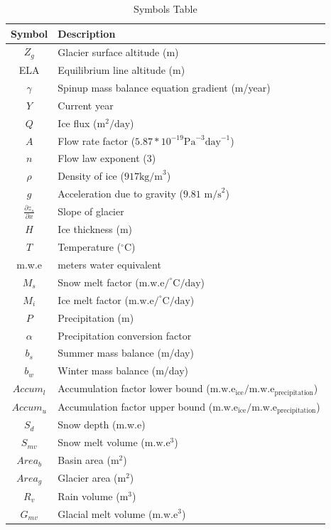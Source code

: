 \documentclass{article}
\begin{document}
\begin{table}[h!]
    \centering
    \begin{tabularx}{\textwidth}{|c|X|}
        \hline
        Symbol & Description \\
        \hline
        $Z_g$ & Glacier surface altitude (m) \\
        ELA & Equilibrium line altitude (m)\\
        $\gamma$ & Spinup mass balance equation gradient (m/year)\\
        $Y$ & Current year \\
        $Q$ & Ice flux ($\text{m}^2/\text{day}$)\\
        $A$ & Flow rate factor ($5.87*10^{-19}\text{Pa}^{-3}\text{day}^{-1}$) \\
        $n$ & Flow law exponent (3) \\
        $\rho$ & Density of ice ($917\text{kg/m}^3$) \\
        $g$ & Acceleration due to gravity ($9.81\text{ m/s}^2$) \\
        $\frac{\partial z_s}{\partial x}$ & Slope of glacier \\
        $H$ & Ice thickness (m)\\
        $T$ & Temperature ($^\circ$C) \\
        m.w.e & meters water equivalent \\
        $M_{s}$ & Snow melt factor ($\text{m.w.e}/^\circ\text{C}/\text{day}$) \\
        $M_{i}$ & Ice melt factor ($\text{m.w.e}/^\circ\text{C}/\text{day}$) \\
        $P$ & Precipitation (m) \\
        $\alpha$ & Precipitation conversion factor \\
        $b_s$ & Summer mass balance (m/day) \\
        $b_w$ & Winter mass balance (m/day) \\
        ${Accum}_{l}$ & Accumulation factor lower bound ($\text{m.w.e}_{\text{ice}}/\text{m.w.e}_{\text{precipitation}}$) \\
        ${Accum}_{u}$ & Accumulation factor upper bound ($\text{m.w.e}_{\text{ice}}/\text{m.w.e}_{\text{precipitation}}$) \\
        $S_{d}$ & Snow depth (m.w.e) \\
        $S_{mv}$ & Snow melt volume ($\text{m.w.e}^3$) \\
        ${Area}_{b}$ & Basin area ($\text{m}^2$) \\
        ${Area}_{g} $ & Glacier area ($\text{m}^2$) \\
        $R_{v}$ & Rain volume ($\text{m}^3$) \\
        $G_{mv}$ & Glacial melt volume ($\text{m.w.e}^3$) \\
        \hline
    \end{tabularx}
    \caption{Symbols Table}
    \label{tab:symbols_table}
\end{table}
\FloatBarrier
\end{document}
